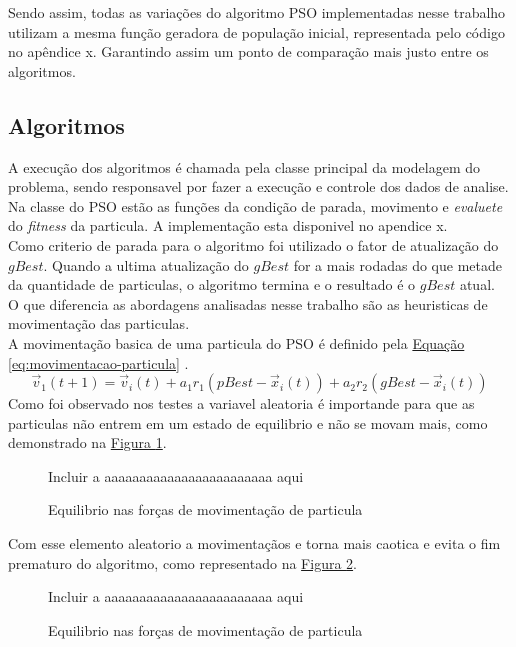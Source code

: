 Sendo assim, todas as variações do algoritmo PSO implementadas nesse trabalho utilizam a mesma função geradora de população inicial, representada pelo código no apêndice x. %
\noindent Garantindo assim um ponto de comparação mais justo entre os algoritmos.
\subsection{Algoritmos}
A execução dos algoritmos é chamada pela classe principal da modelagem do problema, sendo responsavel por fazer a execução e controle dos dados de analise.\\
Na classe do PSO estão as funções da condição de parada, movimento e \textit{evaluete} do \textit{fitness} da particula. A implementação esta disponivel no apendice x.\\ %
%
%
Como criterio de parada para o algoritmo foi utilizado o fator de atualização do $gBest$. Quando a ultima atualização do $gBest$ for a mais rodadas do que metade da quantidade de particulas, o algoritmo termina e o resultado é o $gBest$ atual.\\
\indent O que diferencia as abordagens analisadas nesse trabalho são as heuristicas de movimentação das particulas.\\
A movimentação basica de uma particula do PSO é definido pela
\hyperref[eq:movimentacao-particula]{Equação \ref{eq:movimentacao-particula}}
.
%
\begin{equation} 
    \label{eq:movimentacao-particula}
    \vec v_1(t+1)= \vec v_i(t) + a_1 r_1 (pBest - \vec x_i(t)) + a_2 r_2 (gBest - \vec x_i(t))
\end{equation}
%
Como foi observado nos testes a variavel aleatoria é importande para que as particulas não entrem em um estado de equilibrio e não se movam mais, como demonstrado na \hyperref[fig:equelibrio-particulas]{Figura \ref{fig:equelibrio-particulas}}.
\begin{figure}[ht]
    \centering
    \small{Incluir a aaaaaaaaaaaaaaaaaaaaaaaa aqui}
    \caption{Equilibrio nas forças de movimentação de particula}
    \label{fig:equelibrio-particulas}
\end{figure}

Com esse elemento aleatorio a movimentaçãos e torna mais caotica e evita o fim prematuro do algoritmo, como representado na \hyperref[fig:rand-particulas]{Figura \ref{fig:rand-particulas}}.
\begin{figure}[ht]
    \centering
    \small{Incluir a aaaaaaaaaaaaaaaaaaaaaaaa aqui}
    \caption{Equilibrio nas forças de movimentação de particula}
    \label{fig:rand-particulas}
\end{figure}

